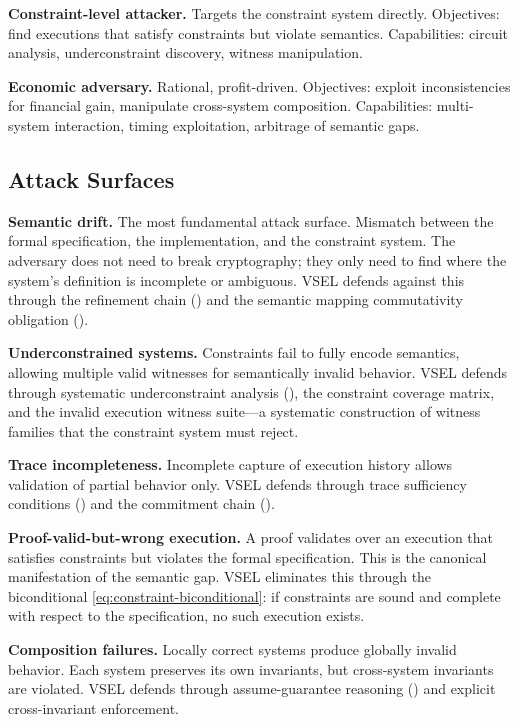 \documentclass[11pt,a4paper]{article}
\theoremstyle{definition}
\begin{document}
\noindent\textbf{Constraint-level attacker.} Targets the constraint system directly. Objectives: find executions that satisfy constraints but violate semantics. Capabilities: circuit analysis, underconstraint discovery, witness manipulation.

\noindent\textbf{Economic adversary.} Rational, profit-driven. Objectives: exploit inconsistencies for financial gain, manipulate cross-system composition. Capabilities: multi-system interaction, timing exploitation, arbitrage of semantic gaps.

\subsection{Attack Surfaces}
\label{subsec:attack-surfaces}

\noindent\textbf{Semantic drift.} The most fundamental attack surface. Mismatch between the formal specification, the implementation, and the constraint system. The adversary does not need to break cryptography; they only need to find where the system's definition is incomplete or ambiguous. VSEL defends against this through the refinement chain () and the semantic mapping commutativity obligation ().

\noindent\textbf{Underconstrained systems.} Constraints fail to fully encode semantics, allowing multiple valid witnesses for semantically invalid behavior. VSEL defends through systematic underconstraint analysis (), the constraint coverage matrix, and the invalid execution witness suite---a systematic construction of witness families that the constraint system must reject.

\noindent\textbf{Trace incompleteness.} Incomplete capture of execution history allows validation of partial behavior only. VSEL defends through trace sufficiency conditions () and the commitment chain ().

\noindent\textbf{Proof-valid-but-wrong execution.} A proof validates over an execution that satisfies constraints but violates the formal specification. This is the canonical manifestation of the semantic gap. VSEL eliminates this through the biconditional \eqref{eq:constraint-biconditional}: if constraints are sound and complete with respect to the specification, no such execution exists.

\noindent\textbf{Composition failures.} Locally correct systems produce globally invalid behavior. Each system preserves its own invariants, but cross-system invariants are violated. VSEL defends through assume-guarantee reasoning () and explicit cross-invariant enforcement.
\end{document}
